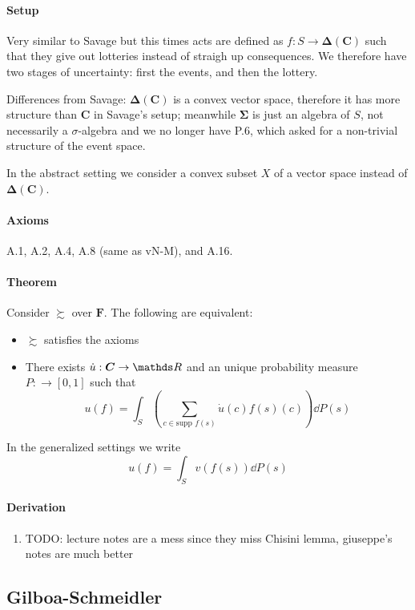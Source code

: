 \documentclass[14pt]{extarticle}
\begin{document}
\paragraph{Setup}
Very similar to Savage
but this times acts are defined as $f: S \to \bm \Delta(\bm C)$
such that they give out lotteries instead of straigh up consequences.
We therefore have two stages of uncertainty: first the events, and then the lottery.

Differences from Savage: $\bm \Delta(\bm C)$ is a convex vector space,
therefore it has more structure than $\bm C$ in Savage's setup;
meanwhile $\bm \Sigma$ is just an algebra	of $S$, not necessarily a $\sigma$-algebra
and we no longer have P.6, which asked for a non-trivial structure of the event space.

In the abstract setting we consider a convex subset $X$ of a vector space
instead of $\bm \Delta(\bm C)$.

\paragraph{Axioms} A.1, A.2, A.4, A.8 (same as vN-M), and A.16.

\paragraph{Theorem}
Consider $\succsim$ over $\bm F$.
The following are equivalent:
\begin{itemize}
	\item $\succsim$ satisfies the axioms
	\item There exists $\dot u: \bm C \to \R$ and an unique probability measure $P: \bm \to [0, 1]$
	      such that
	      \[
		      u(f) = \int_S \left( \sum_{c\in \text{supp } f(s)} \dot u(c) f(s)(c) \right) \dd P(s)
	      \]
\end{itemize}
In the generalized settings we write
\[
	u(f) = \int_S v(f(s))\dd P(s)
\]

\paragraph{Derivation}
\begin{enumerate}
	\item TODO: lecture notes are a mess since they miss Chisini lemma,
	      giuseppe's notes are much better
\end{enumerate}

\subsection{Gilboa-Schmeidler}
\end{document}
